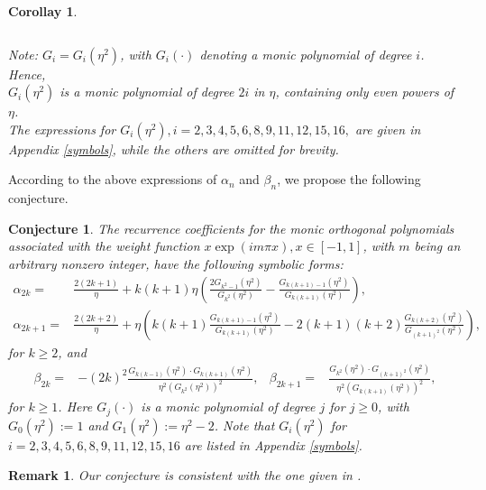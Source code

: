 \documentclass[11pt,a4paper]{article}
\newtheorem{corollary}[theorem]{Corollay}
\newtheorem{remark}[theorem]{Remark}
\newtheorem{conjecture}[theorem]{Conjecture}
\numberwithin{equation}{section}
\begin{document}
\begin{corollary}
\begin{table}[H]
\begin{tabular}{|c|c|c|}
\hline
\end{tabular}
\par {\small Note: $G_i=G_i(\eta^2)$, with $G_i(\cdot)$ denoting a monic polynomial of degree $i$. Hence, \\ $G_i(\eta^2)$ is a monic polynomial of degree $2i$ in $\eta$, containing only even powers of $\eta$.\\ The expressions for $G_i(\eta^2), i=2,3,4,5,6,8,9,11,12,15,16,$ are given in\\ Appendix \ref{symbols}, while the others are omitted for brevity.}
\end{table}
\end{corollary}

According to the above expressions of $\alpha_n$ and $\beta_n$, we propose the following conjecture.
\begin{conjecture} The recurrence coefficients for the monic orthogonal polynomials associated with the weight function $x\exp(im\pi x), x\in[-1,1]$, with $m$ being an arbitrary nonzero integer, have the following symbolic forms:
\begin{align*}
\alpha_{2k}=&\frac{2(2k+1)}{\eta}+k(k+1)\eta\left(\frac{2G_{k^2-1}(\eta^2)}{G_{k^2}(\eta^2)}-\frac{G_{k(k+1)-1}(\eta^2)}{G_{k(k+1)}(\eta^2)}\right),\\ \alpha_{2k+1}=&\frac{2(2k+2)}{\eta}+\eta\left(k(k+1)\frac{G_{k(k+1)-1}(\eta^2)}{G_{k(k+1)}(\eta^2)}-2(k+1)(k+2)\frac{G_{k(k+2)}(\eta^2)}{G_{(k+1)^2}(\eta^2)}\right),
\end{align*}
for $k\geq2$, and
\begin{align*}
\beta_{2k} =& -(2k)^2\frac{G_{k(k-1)}(\eta^2)\cdot G_{k(k+1)}(\eta^2)}{\eta^2 \left(G_{k^2}(\eta^2)\right)^2},& \beta_{2k+1} =& \frac{G_{k^2}(\eta^2)\cdot G_{(k+1)^2}(\eta^2)}{\eta^2 \left(G_{k(k+1)}(\eta^2)\right)^2},
\end{align*}
for $k\geq1$. Here $G_j(\cdot)$ is a monic polynomial of degree $j$ for $j\geq0$, with $G_0(\eta^2):=1$ and $G_1(\eta^2):=\eta^2-2$. Note that $G_i(\eta^2)$ for $i=2,3,4,5,6,8,9,11,12,15,16$ are listed in Appendix \ref{symbols}.
\end{conjecture}

\begin{remark}
Our conjecture is consistent with the one given in \cite[Conjecture 3.1]{MC05-2}.
\end{remark}
\end{document}
